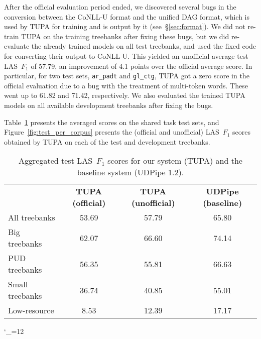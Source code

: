\documentclass[11pt,a4paper]{article}
\begin{document}
After the official evaluation period ended,
we discovered several bugs in the conversion between the CoNLL-U format
and the unified DAG format, which is used by TUPA for training and is output by it
(see~\S\ref{sec:format}).
We did not re-train TUPA on the training treebanks after fixing these bugs,
but we did re-evaluate the already trained models on all test treebanks,
and used the fixed code for converting their output to CoNLL-U.
This yielded an unofficial average test LAS~$F_1$ of 57.79,
an improvement of 4.1 points over the official average score.
In particular, for two test sets, \verb|ar_padt| and \verb|gl_ctg|, TUPA got
a zero score in the official evaluation due to a bug with the treatment of multi-token words.
These went up to 61.82 and 71.42, respectively.
We also evaluated the trained TUPA models on all available development treebanks
after fixing the bugs.

Table~\ref{tab:overall_results} presents the
averaged scores on the shared task test sets,
and Figure~\ref{fig:test_per_corpus} presents the (official and unofficial) LAS~$F_1$
scores obtained by TUPA on each of the test and development treebanks.

\begin{table}
\begin{tabular}{lccc}
\hline
& \multirow{2}{12mm}{\bf TUPA {\small(official)}} & \multirow{2}{15mm}{\bf TUPA {\small(unofficial)}}
& \multirow{2}{14mm}{\bf UDPipe {\small(baseline)}} \\\\
\hline
All treebanks & 53.69 & 57.79 & 65.80 \\
Big treebanks & 62.07 & 66.60 & 74.14 \\
PUD treebanks & 56.35 & 55.81 & 66.63 \\
Small treebanks & 36.74 & 40.85 & 55.01 \\
Low-resource & 8.53 & 12.39 & 17.17
\end{tabular}
\caption{Aggregated test LAS~$F_1$ scores
for our system (TUPA) and the baseline system (UDPipe 1.2).
\label{tab:overall_results}}
\end{table}

\catcode`\_=12
\corpusa
{}\corpusb
{}\corpusc
\end{document}
